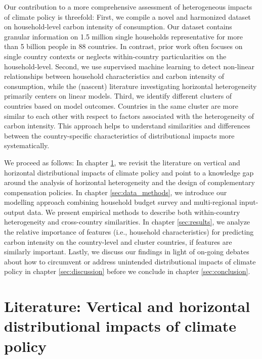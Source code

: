 \documentclass[12pt, a4paper]{article}
\begin{document}
Our contribution to a more comprehensive assessment of heterogeneous impacts of climate policy is threefold: First, we compile a novel and harmonized dataset on household-level carbon intensity of consumption. Our dataset contains granular information on 1.5 million single households representative for more than 5 billion people in 88 countries. In contrast, prior work often focuses on single country contexts or neglects within-country particularities on the household-level. Second, we use supervised machine learning to detect non-linear relationships between household characteristics and carbon intensity of consumption, while the (nascent) literature investigating horizontal heterogeneity primarily centers on linear models. Third, we identify different clusters of countries based on model outcomes. Countries in the same cluster are more similar to each other with respect to factors associated with the heterogeneity of carbon intensity. This approach helps to understand similarities and differences between the country-specific characteristics of distributional impacts more systematically. %

We proceed as follows: In chapter \ref{sec:literature}, we revisit the literature on vertical and horizontal distributional impacts of climate policy and point to a knowledge gap around the analysis of horizontal heterogeneity and the design of complementary compensation policies. In chapter \ref{sec:data_methods}, we introduce our modelling approach combining household budget survey and multi-regional input-output data. We present empirical methods to describe both within-country heterogeneity and cross-country similarities. In chapter \ref{sec:results}, we analyze the relative importance of features (i.e., household characteristics) for predicting carbon intensity on the country-level and cluster countries, if features are similarly important. Lastly, we discuss our findings in light of on-going debates about how to circumvent or address unintended distributional impacts of climate policy in chapter \ref{sec:discussion} before we conclude in chapter \ref{sec:conclusion}.  

\section{Literature: Vertical and horizontal distributional impacts of climate policy} \label{sec:literature}
\end{document}
